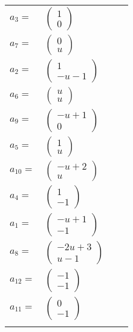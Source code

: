 \documentclass[1p]{elsarticle_modified}
\theoremstyle{definition}
\begin{document}
\begin{tabular}{m{7pt} m{180pt} m{7pt} m{180pt} }
\flushright $a_{3}=$&$\begin{pmatrix}1\\0\end{pmatrix}$ \\
\flushright $a_{7}=$&$\begin{pmatrix}0\\u\end{pmatrix}$ \\
\flushright $a_{2}=$&$\begin{pmatrix}1\\- u-1\end{pmatrix}$ \\
\flushright $a_{6}=$&$\begin{pmatrix}u\\u\end{pmatrix}$ \\
\flushright $a_{9}=$&$\begin{pmatrix}- u+1\\0\end{pmatrix}$ \\
\flushright $a_{5}=$&$\begin{pmatrix}1\\u\end{pmatrix}$ \\
\flushright $a_{10}=$&$\begin{pmatrix}- u+2\\u\end{pmatrix}$ \\
\flushright $a_{4}=$&$\begin{pmatrix}1\\-1\end{pmatrix}$ \\
\flushright $a_{1}=$&$\begin{pmatrix}- u+1\\-1\end{pmatrix}$ \\
\flushright $a_{8}=$&$\begin{pmatrix}-2 u+3\\u-1\end{pmatrix}$ \\
\flushright $a_{12}=$&$\begin{pmatrix}-1\\-1\end{pmatrix}$ \\
\flushright $a_{11}=$&$\begin{pmatrix}0\\-1\end{pmatrix}$\\&\end{tabular}
\end{document}
